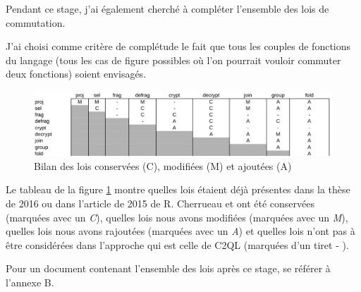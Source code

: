 Pendant ce stage, j'ai également cherché à compléter l'ensemble des lois de commutation.

J'ai choisi comme critère de complétude le fait que tous les couples de fonctions
du langage (tous les cas de figure possibles où l'on pourrait vouloir commuter
deux fonctions) soient envisagés.

\begin{figure}
\includegraphics[width=\textwidth]{complLoisBilan.png}
\caption{Bilan des lois conservées (C), modifiées (M) et ajoutées (A)}
\label{complLois}
\end{figure}

Le tableau de la figure \ref{complLois}  montre quelles lois étaient déjà
présentes dans la thèse de 2016 ou dans l'article de 2015 de R. Cherrueau
et ont été conservées (marquées avec un \emph{C}),
quelles lois nous avons modifiées (marquées avec un \emph{M}),
quelles lois nous avons rajoutées (marquées avec un \emph{A})
et quelles lois n'ont pas à être considérées dans l'approche qui est celle
de C2QL (marquées d'un tiret \og - \fg{}).

Pour un document contenant l'ensemble des lois après ce stage,
se référer à l'annexe B.
